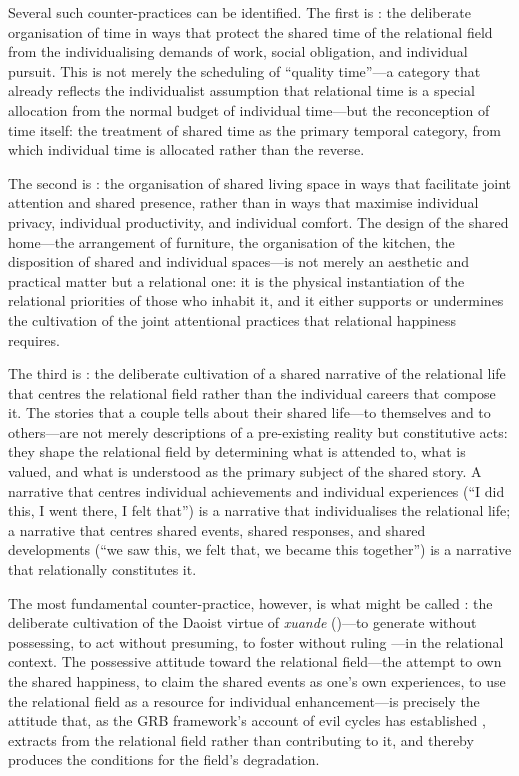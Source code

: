 Several such counter-practices can be identified. The first is : the deliberate organisation of time in ways that protect the shared time of the relational field from the individualising demands of work, social obligation, and individual pursuit. This is not merely the scheduling of ``quality time''---a category that already reflects the individualist assumption that relational time is a special allocation from the normal budget of individual time---but the reconception of time itself: the treatment of shared time as the primary temporal category, from which individual time is allocated rather than the reverse.

The second is : the organisation of shared living space in ways that facilitate joint attention and shared presence, rather than in ways that maximise individual privacy, individual productivity, and individual comfort. The design of the shared home---the arrangement of furniture, the organisation of the kitchen, the disposition of shared and individual spaces---is not merely an aesthetic and practical matter but a relational one: it is the physical instantiation of the relational priorities of those who inhabit it, and it either supports or undermines the cultivation of the joint attentional practices that relational happiness requires.

The third is : the deliberate cultivation of a shared narrative of the relational life that centres the relational field rather than the individual careers that compose it. The stories that a couple tells about their shared life---to themselves and to others---are not merely descriptions of a pre-existing reality but constitutive acts: they shape the relational field by determining what is attended to, what is valued, and what is understood as the primary subject of the shared story. A narrative that centres individual achievements and individual experiences (``I did this, I went there, I felt that'') is a narrative that individualises the relational life; a narrative that centres shared events, shared responses, and shared developments (``we saw this, we felt that, we became this together'') is a narrative that relationally constitutes it.

The most fundamental counter-practice, however, is what might be called : the deliberate cultivation of the Daoist virtue of \emph{xuande} ()---to generate without possessing, to act without presuming, to foster without ruling \parencite{laozi1963}---in the relational context. The possessive attitude toward the relational field---the attempt to own the shared happiness, to claim the shared events as one's own experiences, to use the relational field as a resource for individual enhancement---is precisely the attitude that, as the GRB framework's account of evil cycles has established \parencite{paperix}, extracts from the relational field rather than contributing to it, and thereby produces the conditions for the field's degradation.


